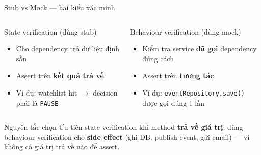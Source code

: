\documentclass[aspectratio=169,12pt]{beamer}
\begin{document}
\begin{frame}{Stub vs Mock --- hai kiểu xác minh}
  \begin{columns}
    \begin{block}{State verification (dùng stub)}
      \begin{itemize}\small
        \item Cho dependency trả dữ liệu định sẵn
        \item Assert trên \textbf{kết quả trả về}
        \item Ví dụ: watchlist hit $\to$ decision phải là \texttt{PAUSE}
      \end{itemize}
    \end{block}

    \begin{block}{Behaviour verification (dùng mock)}
      \begin{itemize}\small
        \item Kiểm tra service \textbf{đã gọi} dependency đúng cách
        \item Assert trên \textbf{tương tác}
        \item Ví dụ: \texttt{eventRepository.save()} được gọi đúng 1 lần
      \end{itemize}
    \end{block}
  \end{columns}

  \medskip
  \begin{alertblock}{Nguyên tắc chọn}
    Ưu tiên state verification khi method \textbf{trả về giá trị}; dùng
    behaviour verification cho \textbf{side effect} (ghi DB, publish event,
    gửi email) --- vì không có giá trị trả về nào để assert.
  \end{alertblock}
\end{frame}
\end{document}
